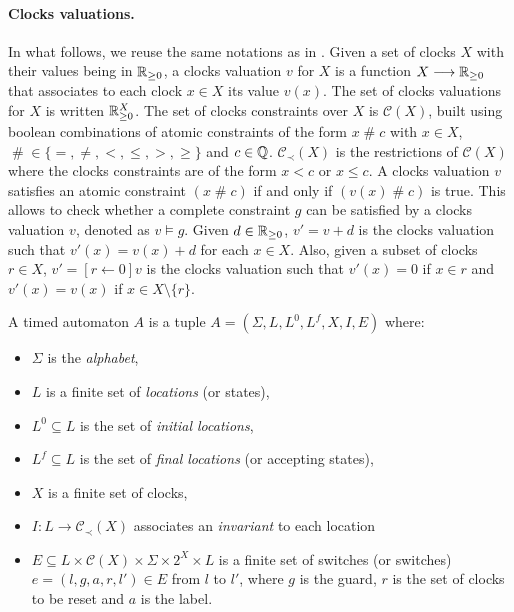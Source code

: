 \paragraph{Clocks valuations.}
In what follows, we reuse the same notations as in \cite{RADLD94,RA98}.
Given a set of clocks $X$ with their values being in $\mathbb{R}_{\geq 0}$, a clocks valuation $v$ for $X$ is a function $X \longrightarrow \mathbb{R}_{\geq 0}$ that associates to each clock $x \in X$ its value $v(x)$. The set of clocks valuations for $X$ is written $\mathbb{R}_{\geq 0}^X$. The set of clocks constraints over $X$ is $\mathcal{C}(X)$, built using boolean combinations of atomic constraints of the form $x \;\#\; c$ with $x \in X$, $\;\#\; \in \{=, \neq, <, \leq, >, \geq \}$ and $c \in \mathbb{Q}$. $\mathcal{C}_{\prec}(X)$ is the restrictions of $\mathcal{C}(X)$ where the clocks constraints are of the form $x < c$ or $x \leq c$. A clocks valuation $v$ satisfies an atomic constraint $(x \;\#\; c)$ if and only if $(v(x) \;\#\; c)$ is true. This allows to check whether a complete constraint $g$ can be satisfied by a clocks valuation $v$, denoted as $v \models g$. Given $d \in \mathbb{R}_{\geq 0}$, $v' = v + d$ is the clocks valuation such that $v'(x) = v(x) + d$ for each $x \in X$. Also, given a subset of clocks $r \in X$, $v' = [r \leftarrow 0]v$ is the clocks valuation such that $v'(x) = 0$ if $x \in r$ and $v'(x) = v(x)$ if $x \in X \setminus \{ r \}$.

\begin{definition} \cite{RADLD94,RA98}
  
A timed automaton $A$ is a tuple $A = (\Sigma, L, L^0, L^f, X, I, E)$ where:
\begin{itemize}

    \item $\Sigma$ is the \emph{alphabet},

    \item $L$ is a finite set of \emph{locations} (or states),

    \item $L^0 \subseteq L$ is the set of \emph{initial locations},

    \item $L^f \subseteq L$ is the set of \emph{final locations} (or accepting states),

    \item $X$ is a finite set of clocks,

    \item $I : L \rightarrow \mathcal{C}_{\prec}(X)$ associates an \emph{invariant} to each location

    \item $E \subseteq L \times \mathcal{C}(X) \times \Sigma \times 2^X \times L$ is a finite set of switches (or switches) $e = (l, g, a, r, l') \in E$ from $l$ to $l'$, where $g$ is the guard, $r$ is the set of clocks to be reset and $a$ is the label.

\end{itemize}
\end{definition}

